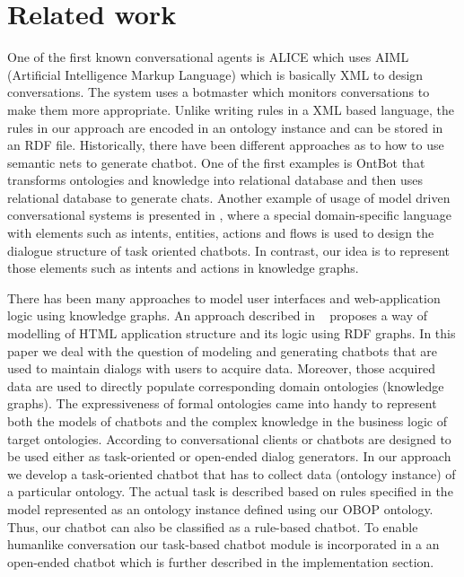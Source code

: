 \documentclass[runningheads]{llncs}
\begin{document}
\section{Related work}
One of the first known conversational agents is ALICE \cite{wallace2009anatomy} which uses AIML (Artificial Intelligence Markup Language) which is basically XML to design conversations. The system uses a botmaster which monitors conversations to make them more appropriate. Unlike writing rules in a XML based language, the rules in our approach are encoded in an ontology instance and can be stored in an RDF file. Historically, there have been different approaches as to how to use semantic nets to generate chatbot. One of the first examples is OntBot \cite{al2011ontbot} that transforms ontologies and knowledge into relational database and then uses relational database to generate chats. Another example of usage of model driven conversational systems is presented in \cite{perez2020model}, where a special domain-specific language with elements such as intents, entities, actions and flows is used to design the dialogue structure of task oriented chatbots. In contrast, our idea is to represent those elements such as intents and actions in knowledge graphs.  

There has been many approaches to model user interfaces and web-application logic using knowledge graphs. An approach described in ~\cite{rutesic2021enhanced} proposes a way of modelling of HTML application structure and its logic using RDF graphs.
In this paper we deal with the question of modeling and generating chatbots that are used to maintain dialogs with users to acquire data. Moreover, those acquired data are used to directly populate corresponding domain ontologies (knowledge graphs). The expressiveness of formal ontologies came into handy to represent both the models of chatbots and the complex knowledge in the business logic of target ontologies. According to \cite{agarwal2020review} conversational clients or chatbots are designed to be used either as task-oriented or open-ended dialog generators. In our approach we develop a task-oriented chatbot that has to collect data (ontology instance) of a particular ontology. The actual task is described based on rules specified in the model represented as an ontology instance defined using our OBOP ontology. Thus, our chatbot can also be classified as a rule-based chatbot. To enable humanlike conversation our task-based chatbot module is incorporated in a an open-ended chatbot which is further described in the implementation section.     
\end{document}
